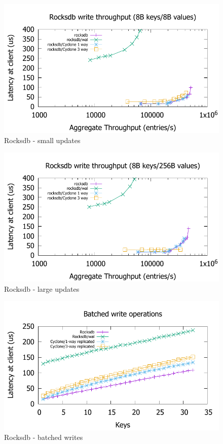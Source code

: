 \documentclass[letterpaper,twocolumn,10pt]{article}
\begin{document}
\begin{figure}
  \centering
  \includegraphics[scale=0.6]{results2/rocksdb.pdf}
  \caption{Rocksdb - small updates}
  \label{fig:rocksdb}
\end{figure}
\begin{figure}
    \includegraphics[scale=0.6]{results2/rocksdb_256.pdf}
    \caption{Rocksdb - large updates}
    \label{fig:rocksdb_256}
\end{figure}
\begin{figure}
    \includegraphics[scale=0.6]{results2/rocksdb_multi.pdf}
    \caption{Rocksdb - batched writes}
    \label{fig:rocksdb_multi}
\end{figure}
\end{document}
